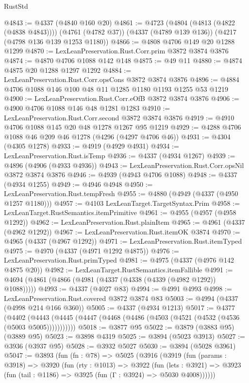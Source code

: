 \begin{lexlean}{RustStd}
\begin{coremodule}
{\begin{coremodule}
{{{{{{{{{{{{{{{{{{{{{{{{{{{{{{{{@4843 := @4337 (@4840 @160 @20)
@4861 := @4723
    (@4804 (@4813 (@4822 (@4838 @4843))))
    (@4761 (@4782 @37))
    (@4337 (@4789 @139 @136))
    (@4217 (@4798 @136 @139 @1253 @1180))
@4866 := @4808 @4706 @149 @20 @1288 @1299
@4870 := LexLeanPreservation.Rust.Corr.prim @3872 @3874 @3876
@4874 := @4870 @4706 @1088 @142 @148
@4875 := @49 @11
@4880 := @4874 @4875 @20 @1288 @1297 @1292
@4884 := LexLeanPreservation.Rust.Corr.opsCons @3872 @3874 @3876
@4896 := @4884 @4706 @1088 @146 @100 @48 @11 @1285 @1180 @1193 @1255 @53 @1219
@4900 := LexLeanPreservation.Rust.Corr.eOfB @3872 @3874 @3876
@4906 := @4900 @4706 @1088 @146 @48 @1281 @1283
@4910 := LexLeanPreservation.Rust.Corr.second @3872 @3874 @3876
@4919 := @4910 @4706 @1088 @145 @20 @48 @1278 @1267 @95 @1219
@4929 := @4288 @4706 @1088 @46 @209 @46 @1278 (@4296 (@4297 @4706 @46))
@4931 := @4304 (@4305 @1278)
@4933 := @4919 (@4929 @4931)
@4934 := LexLeanPreservation.Rust.isTemp
@4936 := @4337 (@4934 @1267)
@4939 := @4896 (@4906 (@4933 @4936))
@4943 := LexLeanPreservation.Rust.Corr.opsNil @3872 @3874 @3876
@4946 := @4939 (@4943 @4706 @1088)
@4948 := @4337 (@4934 @1255)
@4949 := @4946 @4948
@4950 := LexLeanPreservation.Rust.tempFresh
@4955 := @4880 (@4949 (@4337 (@4950 @1257 @1180)))
@4957 := @4103 LexLeanTarget.TargetSyntax.Prim
@4958 := LexLeanTarget.RustSemantics.itemPrimitive
@4961 := @4955 (@4957 (@4958 @1292))
@4962 := LexLeanPreservation.Rust.plainItem
@4965 := @4961 (@4337 (@4962 @1292))
@4967 := LexLeanPreservation.Rust.itemOK @3874
@4970 := @4965 (@4337 (@4967 @1292))
@4971 := LexLeanPreservation.Rust.itemTyped
@4975 := @4970 (@4337 (@4971 @1292 @4875))
@4976 := LexLeanPreservation.Rust.primTyped
@4981 := @4975 (@4337 (@4976 @142 @4875 @20))
@4982 := LexLeanTarget.RustSemantics.itemFallible
@4991 := @4694 (@4861 (@4866 (@4981 (@4337 (@4338 (@4339 (@4982 @1292)) @1088)))))
@4993 := @4337 (@4027 @83)
@4994 := @4991 @4993
@4998 := LexLeanPreservation.Rust.covered @3872 @3874 @83
@5003 := @4994 (@4337 (@4998 @214 @166 @360))
@5005 := @4337 (@4934 @1213)
@5017 := @4377
    (@4402 (@4443 (@4445 (@4447 (@4468 (@4486 (@4503 (@4521 (@4532 (@4536 (@5003 @5005)))))))))))
@5018 := @3877 @95
@5022 := @3879 (@3883 @95) (@3889 @95)
@5023 := @3898 @4319
@5025 := @3894 (@5023 @3913)
@5027 := @3936 (@3937 @95)
@5028 := @3932 @5027
@5030 := @3894 (@5028 @3961)
@5047 := @3893
    (fun (fn : @78) =>
    @5025
      (@3916
        (@3919
          (fun (params : @3918) =>
          @3920
            (fun (rty : @1013) =>
            @3922
              (fun (lets : @3921) =>
              @3923 (fun (tail : @1186) => @3925 (fun (Γ : @3924) => @5030 @4008))))))
}}}}}}}}}}}}}}}}}}}}}}}}}}}}}}}}
\end{coremodule}}
\end{coremodule}
\end{lexlean}
